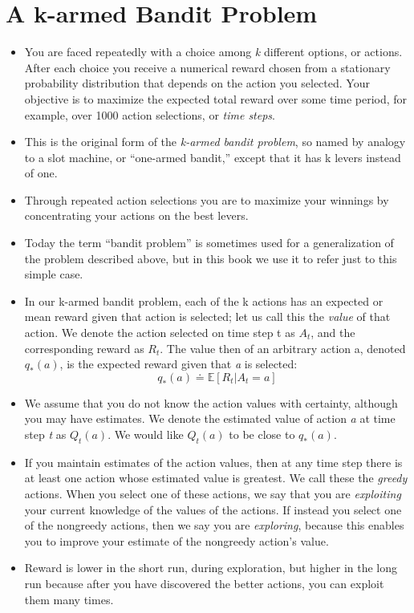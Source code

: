 \documentclass{article}
\begin{document}
\section{A k-armed Bandit Problem}
\begin{itemize}
    \item You are faced repeatedly with a choice among \emph{k} different options, or actions. After each choice you receive a numerical reward chosen from a stationary probability distribution that depends on the action you selected. Your objective is to maximize the expected total reward over some time period, for example, over 1000 action selections, or \emph{time steps}.
    \item This is the original form of the \emph{k-armed bandit problem}, so named by analogy to a slot machine, or “one-armed bandit,” except that it has k levers instead of one.
    \item Through repeated action selections you are to maximize your winnings by concentrating your actions on the best levers.
    \item Today the term “bandit problem” is sometimes used for a generalization of the problem described above, but in this book we use it to refer just to this simple case.
    \item In our k-armed bandit problem, each of the k actions has an expected or mean reward given that action is selected; let us call this the \emph{value} of that action. We denote the action selected on time step t as $A_t$, and the corresponding reward as $R_t$. The value then of an arbitrary action a, denoted $q_*(a)$, is the expected reward given that \emph{a} is selected: $$ q_*(a) \doteq \mathbb{E}[R_t | A_t = a] $$
    \item We assume that you do not know the action values with certainty, although you may have estimates. We denote the estimated value of action \emph{a} at time step \emph{t} as $Q_t(a)$. We would like $Q_t(a)$ to be close to $q_*(a)$.
    \item If you maintain estimates of the action values, then at any time step there is at least one action whose estimated value is greatest. We call these the \emph{greedy} actions. When you select one of these actions, we say that you are \emph{exploiting} your current knowledge of the values of the actions. If instead you select one of the nongreedy actions, then we say you are \emph{exploring}, because this enables you to improve your estimate of the nongreedy action's value.
    \item Reward is lower in the short run, during exploration, but higher in the long run because after you have discovered the better actions, you can exploit them many times.
\end{itemize}
\end{document}
